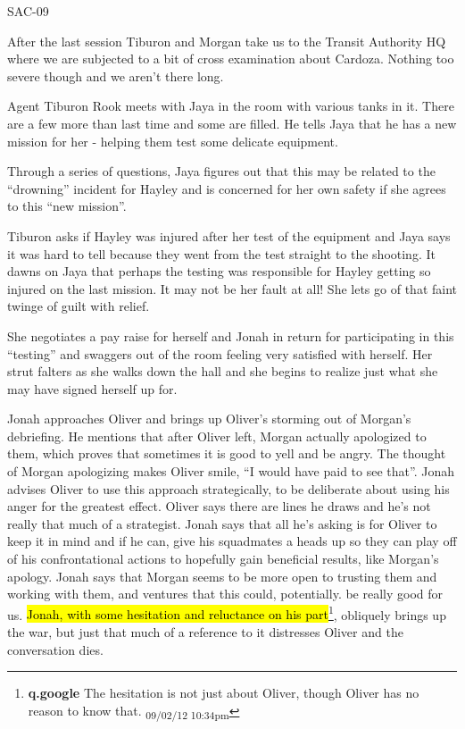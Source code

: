  {\LARGE SAC-09 } 



After the last session Tiburon and Morgan take us to the Transit Authority HQ where we are subjected to a bit of cross examination about Cardoza.  Nothing too severe though and we aren't there long.



Agent Tiburon Rook meets with Jaya in the room with various tanks in it.  There are a few more than last time and some are filled.  He tells Jaya that he has a new mission for her - helping them test some delicate equipment.



Through a series of questions, Jaya figures out that this may be related to the ``drowning'' incident for Hayley and is concerned for her own safety if she agrees to this ``new mission''.



Tiburon asks if Hayley was injured after her test of the equipment and Jaya says it was hard to tell because they went from the test straight to the shooting.   It dawns on Jaya that perhaps the testing was responsible for Hayley getting so injured on the last mission.  It may not be her fault at all!  She lets go of that faint twinge of guilt with relief.



She negotiates a pay raise for herself and Jonah in return for participating in this ``testing'' and swaggers out of the room feeling very satisfied with herself.  Her strut falters as she walks down the hall and she begins to realize just what she may have signed herself up for.



Jonah approaches Oliver and brings up Oliver's storming out of Morgan's debriefing.  He mentions that after Oliver left, Morgan actually apologized to them, which proves that sometimes it is good to yell and be angry.  The thought of Morgan apologizing makes Oliver smile, ``I would have paid to see that''.  Jonah advises Oliver to use this approach strategically, to be deliberate about using his anger for the greatest effect.  Oliver says there are lines he draws and he's not really that much of a strategist.  Jonah says that all he's asking is for Oliver to keep it in mind and if he can, give his squadmates a heads up so they can play off of his confrontational actions to hopefully gain beneficial results, like Morgan's apology.  Jonah says that Morgan seems to be more open to trusting them and working with them, and ventures that this could, potentially. be really good for us.  \hl{Jonah, with some hesitation and reluctance on his part}\footnote{\textbf{q.google }The hesitation is not just about Oliver, though Oliver has no reason to know that. \textsubscript{09/02/12 10:34pm}}, obliquely brings up the war, but just that much of a reference to it distresses Oliver and the conversation dies.



